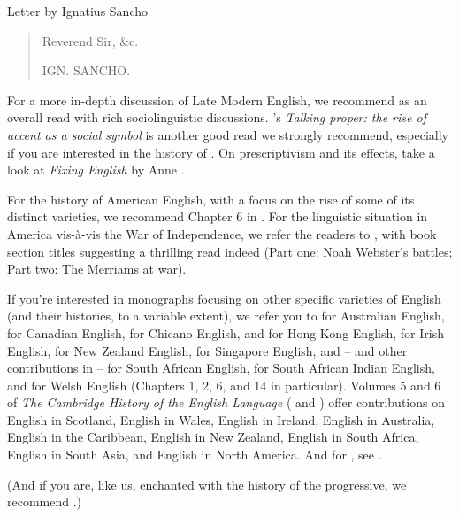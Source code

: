 \begin{texts}{Letter by Ignatius Sancho}
\begin{quote}
    Reverend Sir, \&c.

    IGN. SANCHO.
\end{quote}
\end{texts}
\begin{furtherreading}
For a more in-depth discussion of Late Modern English, we recommend \citet{Beal2004} as an overall read with rich sociolinguistic discussions. \citeauthor{Mugglestone2003}'s \citeyearpar{Mugglestone2003} \textit{Talking proper: the rise of accent as a social symbol} is another good read we strongly recommend, especially if you are interested in the history of . On prescriptivism and its effects, take a look at \textit{Fixing English} by Anne \citet{Curzan2014}.

For the history of American English, with a focus on the rise of some of its distinct varieties, we recommend Chapter 6 in \citet{WolframSchilling-Estes2015}. For the linguistic situation in America vis-\`{a}-vis the War of Independence, we refer the readers to \citet{Martin2019}, with book section titles suggesting a thrilling read indeed (Part one: Noah Webster's battles; Part two: The Merriams at war). 

If you're interested in monographs focusing on other specific varieties of English (and their histories, to a variable extent), we refer you to \citet{Fritz2005} for Australian English, \citet{Orkin2015} for Canadian English, \citet{Fought2003} for Chicano English, \citet{LukeRichards1982} and \citet{Edwards2015} for Hong Kong English, \citet{Hickey2007} for Irish English, \citet{Gordonetal2004} for New Zealand English, \citet{Leimgruber2013} for Singapore English, \citet{LanhamMacdonald1985} and \citet{Lass2002} -- and other contributions in \citet{Mesthrie2002} -- for South African English, \citet{Mesthrie1992} for South African Indian English, and \citet{CouplandThomas1990} for Welsh English (Chapters 1, 2, 6, and 14 in particular). Volumes 5 and 6 of \textit{The Cambridge History of the English Language} (\citealp{Burchfield1994} and \citealp{Algeo2001}) offer contributions on English in Scotland, English in Wales, English in Ireland, English in Australia, English in the Caribbean, English in New Zealand, English in South Africa, English in South Asia, and English in North America. And for , see \citet{Jones1997}.

(And if you are, like us, enchanted with the history of the progressive, we recommend \citealp{Kranich2010}.)
\end{furtherreading}
